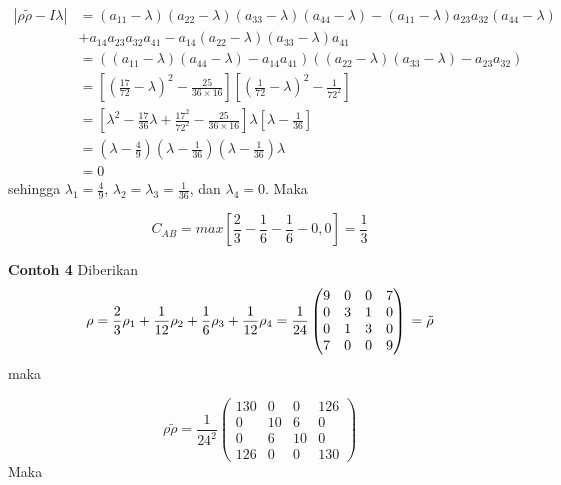 \begin{equation}
	\begin{aligned}
		|\rho \tilde{\rho}-I\lambda|
		&=(a_{11}-\lambda)(a_{22}-\lambda)(a_{33}-\lambda)(a_{44}-\lambda)-(a_{11}-\lambda)a_{23}a_{32}(a_{44}-\lambda)\\
		&+a_{14}a_{23}a_{32}a_{41}-a_{14}(a_{22}-\lambda)(a_{33}-\lambda)a_{41}\\
		&=((a_{11}-\lambda)(a_{44}-\lambda)-a_{14}a_{41})((a_{22}-\lambda)(a_{33}-\lambda)-a_{23}a_{32})\\
		&=[(\frac{17}{72}-\lambda)^2-\frac{25}{36\times16}][(\frac{1}{72}-\lambda)^2-\frac{1}{72^2}]\\
		&=[\lambda^2-\frac{17}{36}\lambda+\frac{17^2}{72^2}-\frac{25}{36\times16}]\lambda[\lambda-\frac{1}{36}]\\
		&=(\lambda-\frac{4}{9})(\lambda-\frac{1}{36})(\lambda-\frac{1}{36})\lambda\\
		&=0
	\end{aligned}
\end{equation}
sehingga $\lambda_1=\frac{4}{9}$, $\lambda_2=\lambda_3=\frac{1}{36}$, dan $
\lambda_4=0$. Maka

\begin{equation}
	C_{AB}=max[\frac{2}{3}-\frac{1}{6}-\frac{1}{6}-0,0]=\frac{1}{3}
\end{equation}

\textbf{Contoh 4}
Diberikan
\begin{equation}
	\rho = \frac{2}{3}\rho_1 + \frac{1}{12}\rho_2
	+\frac{1}{6}\rho_3+\frac{1}{12}\rho_4\\
	=\frac{1}{24}
	\begin{pmatrix}
		9&0&0&7\\
		0&3&1&0\\
		0&1&3&0\\
		7&0&0&9
	\end{pmatrix}\\
	=\tilde{\rho}
\end{equation}
maka 

\begin{equation}
	\rho \tilde{\rho} =\frac{1}{24^2}
	\begin{pmatrix}
		130&0&0&126\\
		0&10&6&0\\
		0&6&10&0\\
		126&0&0&130
	\end{pmatrix}
\end{equation}
Maka

